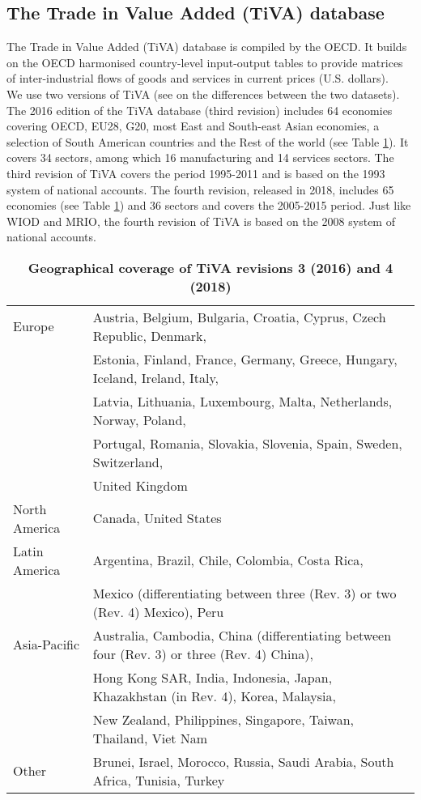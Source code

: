 \documentclass[11pt,a4paper]{paper} %
\begin{document}
\subsection{The Trade in Value Added (TiVA) database}
The Trade in Value Added (TiVA) database is compiled by the OECD. 
It builds on the OECD harmonised country-level input-output tables to provide matrices of inter-industrial flows of goods and services in current prices (U.S. dollars).\\
We use two versions of TiVA (see \cite{OECD2018} on the differences between the two datasets).
The 2016 edition of the TiVA database (third revision) includes 64 economies covering OECD, EU28, G20, most East and South-east Asian economies, a selection of South American countries and the Rest of the world (see Table \ref{tab:tiva}). It covers 34 sectors, among which 16 manufacturing and 14 services sectors. 
The third revision of TiVA covers the period 1995-2011 and is based on the 1993 system of national accounts.
The fourth revision, released in 2018, includes 65 economies (see Table \ref{tab:tiva}) and 36 sectors and covers the 2005-2015 period. 
Just like WIOD and MRIO, the fourth revision of TiVA is based on the 2008 system of national accounts.


\begin{table}[!h]
\begin{threeparttable}
\centering
\centering
\caption{\small{\textbf{Geographical coverage of TiVA revisions 3 (2016) and 4 (2018)}}}
\small
\begin{tabular}{ll}
\hline\hline
Europe & Austria, Belgium, Bulgaria, Croatia, Cyprus, Czech Republic, Denmark,\\
& Estonia, Finland, France, Germany, Greece, Hungary, Iceland, Ireland, Italy,\\
& Latvia, Lithuania, Luxembourg, Malta, Netherlands, Norway, Poland,\\
&Portugal, Romania, Slovakia, Slovenia, Spain, Sweden, Switzerland,\\
& United Kingdom\\
North  America& Canada, United States\\
Latin America & Argentina, Brazil, Chile, Colombia, Costa Rica, \\ 
&Mexico (differentiating between three (Rev. 3) or two (Rev. 4) Mexico), Peru\\
Asia-Pacific & Australia, Cambodia, China (differentiating between four (Rev. 3) or three (Rev. 4) China), \\
& Hong Kong SAR, India, Indonesia, Japan, Khazakhstan (in Rev. 4), Korea, Malaysia, \\
& New Zealand, Philippines, Singapore, Taiwan, Thailand, Viet Nam\\
Other & Brunei, Israel, Morocco, Russia, Saudi Arabia, South Africa, Tunisia, Turkey\\
\hline\hline
\end{tabular} 
\label{tab:tiva}
\end{threeparttable}
\end{table} 
\end{document}
